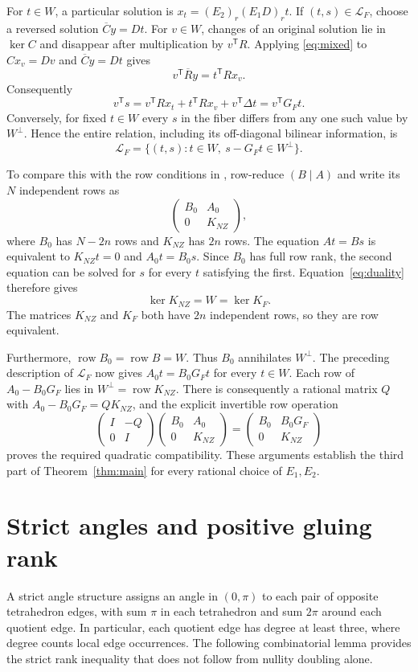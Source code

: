 \documentclass[11pt]{article}
\theoremstyle{definition}\newtheorem{definition}[theorem]{Definition}
\theoremstyle{remark}\newtheorem{remark}[theorem]{Remark}
\newcommand{\Ct}{\overline C}
\newcommand{\Rt}{\overline R}
\begin{document}
For $t\in W$, a particular solution is
$x_t=(E_2)_r(E_1D)_r t$. If $(t,s)\in\mathcal L_F$, choose a
reversed solution $\Ct y=Dt$. For $v\in W$, changes of an original
solution lie in $\ker C$ and disappear after multiplication by
$v^{\mathsf T}R$. Applying \eqref{eq:mixed} to $Cx_v=Dv$ and
$\Ct y=Dt$ gives
\[
v^{\mathsf T}\Rt y=t^{\mathsf T}Rx_v.
\]
Consequently
\[
v^{\mathsf T}s
=v^{\mathsf T}Rx_t+t^{\mathsf T}Rx_v+v^{\mathsf T}\Delta t
=v^{\mathsf T}G_Ft.
\]
Conversely, for fixed $t\in W$ every $s$ in the fiber differs from
any one such value by $W^\perp$. Hence the entire relation, including
its off-diagonal bilinear information, is
\[
\mathcal L_F=
\{(t,s):t\in W,\ s-G_Ft\in W^\perp\}.
\]

To compare this with the row conditions in \cite[Definition~1.1]{Wong},
row-reduce $(B\mid A)$ and write its $N$ independent rows as
\[
\begin{pmatrix}B_0&A_0\\0&K_{NZ}\end{pmatrix},
\]
where $B_0$ has $N-2n$ rows and $K_{NZ}$ has $2n$ rows. The equation
$At=Bs$ is equivalent to $K_{NZ}t=0$ and $A_0t=B_0s$. Since $B_0$
has full row rank, the second equation can be solved for $s$ for
every $t$ satisfying the first. Equation~\eqref{eq:duality} therefore
gives
\[
\ker K_{NZ}=W=\ker K_F.
\]
The matrices $K_{NZ}$ and $K_F$ both have $2n$ independent rows, so
they are row equivalent.

Furthermore, $\operatorname{row}B_0=\operatorname{row}B=W$. Thus
$B_0$ annihilates $W^\perp$. The preceding description of
$\mathcal L_F$ now gives $A_0t=B_0G_Ft$ for every $t\in W$.
Each row of $A_0-B_0G_F$ lies in $W^\perp=\operatorname{row}K_{NZ}$.
There is consequently a rational matrix $Q$ with
$A_0-B_0G_F=QK_{NZ}$, and the explicit invertible row operation
\[
\begin{pmatrix}I&-Q\\0&I\end{pmatrix}
\begin{pmatrix}B_0&A_0\\0&K_{NZ}\end{pmatrix}
=
\begin{pmatrix}B_0&B_0G_F\\0&K_{NZ}\end{pmatrix}
\]
proves the required quadratic compatibility. These arguments establish
the third part of Theorem~\ref{thm:main} for every rational choice of
$E_1,E_2$.

\section{Strict angles and positive gluing rank}\label{sec:geometric}
A strict angle structure assigns an angle in $(0,\pi)$ to each pair
of opposite tetrahedron edges, with sum $\pi$ in each tetrahedron
and sum $2\pi$ around each quotient edge. In particular, each
quotient edge has degree at least three, where degree counts local
edge occurrences. The following combinatorial lemma provides the
strict rank inequality that does not follow from nullity doubling
alone.
\end{document}
